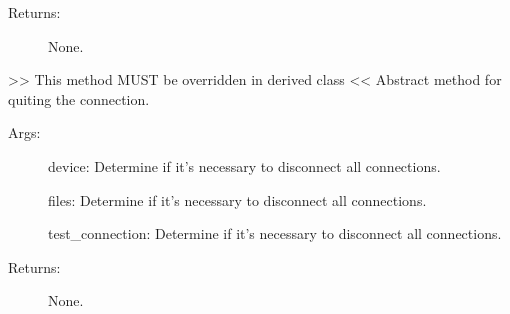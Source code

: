 \documentclass[letterpaper,10pt,english]{sphinxmanual}
\begin{document}
\begin{fulllineitems}
\begin{fulllineitems}
\begin{description}
\item[{Returns:}] \leavevmode
\sphinxAtStartPar
None.

\end{description}

\end{fulllineitems}


\begin{fulllineitems}
\label{\detokenize{QConnectBase:QConnectBase.connection_base.ConnectionBase.config}}
\end{fulllineitems}


\begin{fulllineitems}
\label{\detokenize{QConnectBase:QConnectBase.connection_base.ConnectionBase.connect}}
\sphinxAtStartPar
\textgreater{}\textgreater{} This method MUST be overridden in derived class \textless{}\textless{}
Abstract method for quiting the connection.
\begin{description}
\item[{Args:}] \leavevmode
\sphinxAtStartPar
device: Determine if it’s necessary to disconnect all connections.

\sphinxAtStartPar
files: Determine if it’s necessary to disconnect all connections.

\sphinxAtStartPar
test\_connection: Determine if it’s necessary to disconnect all connections.

\item[{Returns:}] \leavevmode
\sphinxAtStartPar
None.

\end{description}

\end{fulllineitems}



\end{fulllineitems}
\end{document}
